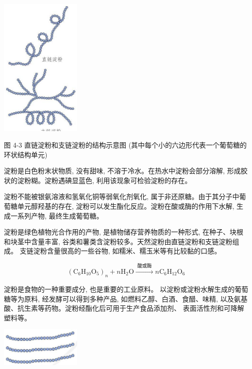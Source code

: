 \documentclass[10pt]{article}
\begin{document}
\begin{center}
\includegraphics[max width=0.3\textwidth]{images/0190efc5-b58a-7c43-bfb0-e0a030df9cfd_113_673620.jpg}
\end{center}

图 4-3 直链淀粉和支链淀粉的结构示意图 (其中每个小的六边形代表一个葡萄糖的环状结构单元)

淀粉是白色粉末状物质, 没有甜味, 不溶于冷水。在热水中淀粉会部分溶解, 形成胶状的淀粉糊。淀粉遇碘显蓝色, 利用该现象可检验淀粉的存在。

淀粉不能被银氨溶液和氢氧化铜等弱氧化剂氧化, 属于非还原糖。由于其分子中葡萄糖单元醇羟基的存在, 淀粉可以发生酯化反应。淀粉在酸或酶的作用下水解, 生成一系列产物, 最终生成葡萄糖。

淀粉是绿色植物光合作用的产物, 是植物储存营养物质的一种形式, 在种子、块根和块茎中含量丰富, 谷类和薯类含淀粉较多。天然淀粉由直链淀粉和支链淀粉组成。 支链淀粉含量很高的一些谷物, 如糯米、糯玉米等有比较黏的口感。

\[
{\left( {\mathrm{C}}_{6}{\mathrm{H}}_{10}{\mathrm{O}}_{5}\right) }_{n} + n{\mathrm{H}}_{2}\mathrm{O}\xrightarrow[]{\text{ 酸或酶 }}n{\mathrm{C}}_{6}{\mathrm{H}}_{12}{\mathrm{O}}_{6}
\]

淀粉是食物的一种重要成分, 也是重要的工业原料。 以淀粉或淀粉水解生成的葡萄糖等为原料, 经发酵可以得到多种产品, 如燃料乙醇、白酒、食醋、味精, 以及氨基酸、抗生素等药物。淀粉经酯化后可用于生产食品添加剂、 表面活性剂和可降解塑料等。

\begin{center}
\includegraphics[max width=0.3\textwidth]{images/0190efc5-b58a-7c43-bfb0-e0a030df9cfd_113_613574.jpg}
\end{center}
\end{document}
